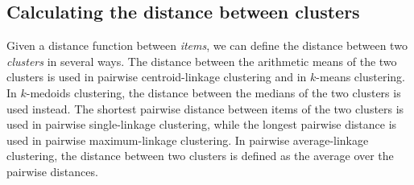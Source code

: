 \documentclass{report}
\begin{document}
\subsection*{Calculating the distance between clusters}

Given a distance function between \emph{items}, we can define the distance between two \emph{clusters} in several ways. The distance between the arithmetic means of the two clusters is used in pairwise centroid-linkage clustering and in $k$-means clustering. In $k$-medoids clustering, the distance between the medians of the two clusters is used instead. The shortest pairwise distance between items of the two clusters is used in pairwise single-linkage clustering, while the longest pairwise distance is used in pairwise maximum-linkage clustering. In pairwise average-linkage clustering, the distance between two clusters is defined as the average over the pairwise distances.
\end{document}
